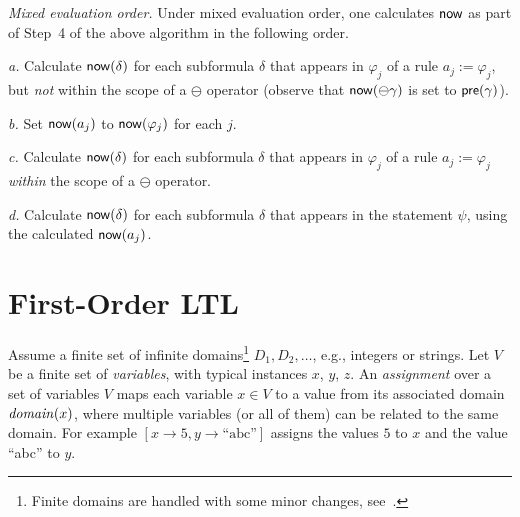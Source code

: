 {\em Mixed evaluation order.}
Under mixed evaluation order, one calculates $\mathsf{now}$ as part of Step~4 of the above algorithm in the following order. 
\begin{description}
\item{\em a.} Calculate 
$\mathsf{now} ( \delta )$ for each subformula $\delta$
that appears in $\varphi_j$ of a rule
$a_j := \varphi_j$, but {\em not} within the scope of
a $\ominus$ operator (observe that
$\mathsf{now} ( \ominus \gamma )$ is set to $\mathsf{pre} ( \gamma )$).
\item{\em b.} Set 
$\mathsf{now} ( a_j )$ to $\mathsf{now} ( \varphi_j )$ for each $j$.
\item{\em c.} Calculate $\mathsf{now} ( \delta )$ for each subformula $\delta$
that appears in $\varphi_j$ of a rule
$a_j := \varphi_j$ {\em  within} the scope of
a $\ominus$ operator.
\item{\em d.} Calculate $\mathsf{now} ( \delta )$ for each subformula $\delta$
that appears in the statement $\psi$, using the calculated $\mathsf{now} ( a_j )$.
\end{description}



\section{First-Order LTL}

\label{sec:syntax-semantics}

Assume a finite set of infinite domains\footnote{Finite domains are handled with some minor changes, see~\cite{HPU}.}
$D_1, D_2, \ldots$,
e.g., integers or strings. 
Let $V$ be a finite set of {\em variables}, 
with typical instances $x$, $y$, $z$.
An {\em assignment} over a set of variables $V$
maps each variable $x \in V$ to a value from
its associated domain $\mathit{domain} ( x )$, where multiple variables (or all of them)
can be related to the same domain. For example
$[ x \rightarrow 5 , y \rightarrow \text{``abc''} ]$ assigns
the values $5$ to $x$ and the value ``abc'' to $y$.

